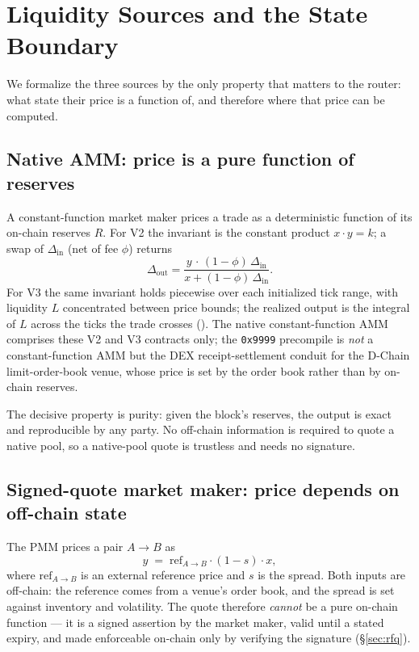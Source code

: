 \section{Liquidity Sources and the State Boundary}
\label{sec:sources}

We formalize the three sources by the only property that matters to the
router: what state their price is a function of, and therefore where
that price can be computed.

\subsection{Native AMM: price is a pure function of reserves}

A constant-function market maker prices a trade as a deterministic
function of its on-chain reserves $R$. For V2 the invariant is the
constant product $x \cdot y = k$; a swap of $\Delta_{\mathrm{in}}$ (net
of fee $\phi$) returns
\[
\Delta_{\mathrm{out}}
= \frac{y \,\cdot\, (1-\phi)\,\Delta_{\mathrm{in}}}
       {x + (1-\phi)\,\Delta_{\mathrm{in}}}.
\]
For V3 the same invariant holds piecewise over each initialized tick
range, with liquidity $L$ concentrated between price bounds; the
realized output is the integral of $L$ across the ticks the trade
crosses (\cite{uniswapv3}). The native constant-function AMM comprises
these V2 and V3 contracts only; the \texttt{0x9999} precompile is
\emph{not} a constant-function AMM but the DEX receipt-settlement conduit
for the D-Chain limit-order-book venue, whose price is set by the order
book rather than by on-chain reserves.

The decisive property is purity: given the block's reserves, the output
is exact and reproducible by any party. No off-chain information is
required to quote a native pool, so a native-pool quote is trustless
and needs no signature.

\subsection{Signed-quote market maker: price depends on off-chain state}

The PMM prices a pair $A \to B$ as
\[
y \;=\; \mathrm{ref}_{A \to B}\cdot(1-s)\cdot x,
\]
where $\mathrm{ref}_{A\to B}$ is an external reference price and $s$ is
the spread. Both inputs are off-chain: the reference comes from a
venue's order book, and the spread is set against inventory and
volatility. The quote therefore \emph{cannot} be a pure on-chain
function --- it is a signed assertion by the market maker, valid until a
stated expiry, and made enforceable on-chain only by verifying the
signature (\S\ref{sec:rfq}).

